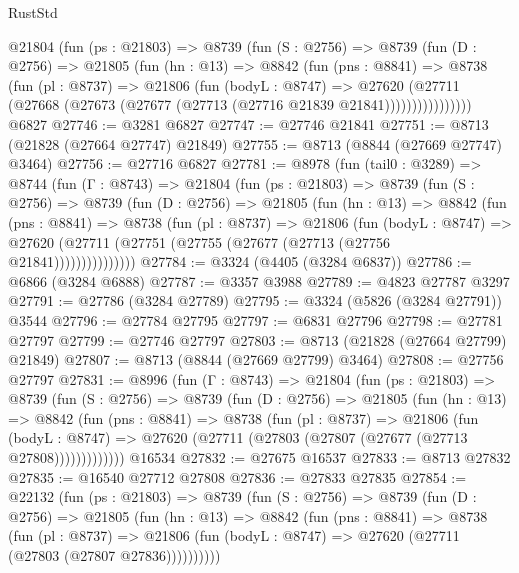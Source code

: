 \begin{lexlean}{RustStd}
\begin{coremodule}
        @21804
          (fun (ps : @21803) =>
          @8739
            (fun (S : @2756) =>
            @8739
              (fun (D : @2756) =>
              @21805
                (fun (hn : @13) =>
                @8842
                  (fun (pns : @8841) =>
                  @8738
                    (fun (pl : @8737) =>
                    @21806
                      (fun (bodyL : @8747) =>
                      @27620
                        (@27711
                          (@27668 (@27673 (@27677 (@27713 (@27716 @21839 @21841))))))))))))))))
    @6827
@27746 := @3281 @6827
@27747 := @27746 @21841
@27751 := @8713 (@21828 (@27664 @27747) @21849)
@27755 := @8713 (@8844 (@27669 @27747) @3464)
@27756 := @27716 @6827
@27781 := @8978
    (fun (tail0 : @3289) =>
    @8744
      (fun (Γ : @8743) =>
      @21804
        (fun (ps : @21803) =>
        @8739
          (fun (S : @2756) =>
          @8739
            (fun (D : @2756) =>
            @21805
              (fun (hn : @13) =>
              @8842
                (fun (pns : @8841) =>
                @8738
                  (fun (pl : @8737) =>
                  @21806
                    (fun (bodyL : @8747) =>
                    @27620 (@27711 (@27751 (@27755 (@27677 (@27713 (@27756 @21841)))))))))))))))
@27784 := @3324 (@4405 (@3284 @6837))
@27786 := @6866 (@3284 @6888)
@27787 := @3357 @3988
@27789 := @4823 @27787 @3297
@27791 := @27786 (@3284 @27789)
@27795 := @3324 (@5826 (@3284 @27791)) @3544
@27796 := @27784 @27795
@27797 := @6831 @27796
@27798 := @27781 @27797
@27799 := @27746 @27797
@27803 := @8713 (@21828 (@27664 @27799) @21849)
@27807 := @8713 (@8844 (@27669 @27799) @3464)
@27808 := @27756 @27797
@27831 := @8996
    (fun (Γ : @8743) =>
    @21804
      (fun (ps : @21803) =>
      @8739
        (fun (S : @2756) =>
        @8739
          (fun (D : @2756) =>
          @21805
            (fun (hn : @13) =>
            @8842
              (fun (pns : @8841) =>
              @8738
                (fun (pl : @8737) =>
                @21806
                  (fun (bodyL : @8747) =>
                  @27620 (@27711 (@27803 (@27807 (@27677 (@27713 @27808)))))))))))))
    @16534
@27832 := @27675 @16537
@27833 := @8713 @27832
@27835 := @16540 @27712 @27808
@27836 := @27833 @27835
@27854 := @22132
    (fun (ps : @21803) =>
    @8739
      (fun (S : @2756) =>
      @8739
        (fun (D : @2756) =>
        @21805
          (fun (hn : @13) =>
          @8842
            (fun (pns : @8841) =>
            @8738
              (fun (pl : @8737) =>
              @21806 (fun (bodyL : @8747) => @27620 (@27711 (@27803 (@27807 @27836))))))))))

\end{coremodule}
\end{lexlean}
